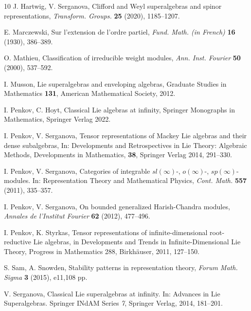\documentclass[12pt]{amsart}
\theoremstyle{plain} %
\numberwithin{equation}{section}
\theoremstyle{definition}
\theoremstyle{remark}
\theoremstyle{plain} %
\begin{document}
\begin{thebibliography}{10}
	 J. Hartwig, V. Serganova, Clifford and Weyl superalgebras and spinor representations, \emph{Transform. Groups.} \textbf{25} (2020), 1185--1207.
	
	 	E. Marczewski,  Sur l'extension de l'ordre partiel, \emph{Fund. Math. (in French)} {\bf 16} (1930), 386--389.
	
 O. Mathieu, Classification of irreducible weight modules, {\it
Ann. Inst. Fourier} {\bf 50} (2000), 537--592.


   	 I. Musson, Lie superalgebras and enveloping algebras, 	Graduate Studies in Mathematics \textbf{131}, American Mathematical Society, 2012.

  I. Penkov, C. Hoyt, Classical Lie algebras at infinity, Springer Monographs in Mathematics, Springer Verlag 2022. 


  I. Penkov,  V. Serganova,   Tensor representations of Mackey Lie algebras and their dense subalgebras, In: Developments and Retrospectives in Lie Theory: Algebraic Methods, Developments in Mathematics, \textbf{38}, Springer Verlag 2014, 291--330.

 
  I. Penkov,  V. Serganova,    Categories of integrable $sl(\infty)$-, $o(\infty)$-, $sp(\infty)$-modules. In: Representation Theory and Mathematical Physics, \emph{Cont. Math.} \textbf{557} (2011), 335--357.
 
 
    I. Penkov,  V. Serganova,   On bounded generalized Harish-Chandra modules, \emph{Annales de l'Institut Fourier} \textbf{62} (2012), 477--496.



   I. Penkov,  K. Styrkas,  Tensor representations of infinite-dimensional root-reductive Lie algebras, in Developments and Trends in Infinite-Dimensional Lie Theory, Progress in Mathematics 288, Birkh\"auser, 2011, 127--150.
   
        S. Sam, A. Snowden, Stability patterns in representation theory, \emph{Forum Math. Sigma} {\bf 3} (2015), e11,108 pp.
   
    V. Serganova,  Classical Lie superalgebras at infinity. In: Advances in Lie Superalgebras. Springer INdAM Series \emph{7}, Springer Verlag,  2014, 181--201.
   
   
   
   \end{thebibliography}
   
\end{document}
